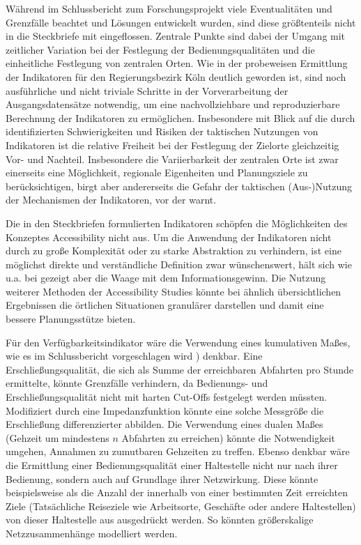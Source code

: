 \documentclass[11pt,pdftex,a4paper]{scrartcl}
\begin{document}
	Während im Schlussbericht zum Forschungsprojekt viele Eventualitäten und Grenzfälle beachtet und Lösungen entwickelt wurden, sind diese größtenteils nicht in die Steckbriefe mit eingeflossen. Zentrale Punkte sind dabei der Umgang mit zeitlicher Variation bei der Festlegung der Bedienungsqualitäten und die einheitliche Festlegung von zentralen Orten. Wie in der probeweisen Ermittlung der Indikatoren für den Regierungsbezirk Köln deutlich geworden ist, sind noch ausführliche und nicht triviale Schritte in der Vorverarbeitung der Ausgangsdatensätze notwendig, um eine nachvollziehbare und reproduzierbare Berechnung der Indikatoren zu ermöglichen. Insbesondere mit Blick auf die durch  \textcite{haldenUseAbuseAccessibility2011} identifizierten Schwierigkeiten und Risiken der taktischen Nutzungen von Indikatoren ist die relative Freiheit bei der Festlegung der Zielorte gleichzeitig Vor- und Nachteil. Insbesondere die Variierbarkeit der zentralen Orte ist zwar einerseits eine Möglichkeit, regionale Eigenheiten und Planungsziele zu berücksichtigen, birgt aber andererseits die Gefahr der taktischen (Aus-)Nutzung der Mechanismen der Indikatoren, vor der \textcite{haldenUseAbuseAccessibility2011} warnt.
	
	Die in den Steckbriefen formulierten Indikatoren schöpfen die Möglichkeiten des Konzeptes Accessibility nicht aus. Um die Anwendung der Indikatoren nicht durch zu große Komplexität oder zu starke Abstraktion zu verhindern, ist eine möglichst direkte und verständliche Definition zwar wünschenswert, hält sich wie u.a. bei \textcites{papaAccessibilityInstrumentsPlanning2016}{silvaAccessibilityInstrumentsPlanning2017}{boisjolyInsiderPlannersPerspective2017}{papaLearningProcessAccessibility2017} gezeigt aber die Waage mit dem Informationsgewinn. Die Nutzung weiterer Methoden der Accessibility Studies könnte bei ähnlich übersichtlichen Ergebnissen die örtlichen Situationen granulärer darstellen und damit eine bessere Planungsstütze bieten.
	
	Für den Verfügbarkeitsindikator wäre die Verwendung eines kumulativen Maßes, wie es im Schlussbericht vorgeschlagen wird \parencite[176f]{kcwgmbhMethodikUndEmpfehlungen2024}) denkbar. Eine Erschließungsqualität, die sich als Summe der erreichbaren Abfahrten pro Stunde ermittelte, könnte Grenzfälle verhindern, da Bedienungs- und Erschließungsqualität nicht mit harten Cut-Offs festgelegt werden müssten. Modifiziert durch eine Impedanzfunktion könnte eine solche Messgröße die Erschließung differenzierter abbilden. Die Verwendung eines dualen Maßes (Gehzeit um mindestens $n$ Abfahrten zu erreichen) könnte die Notwendigkeit umgehen, Annahmen zu zumutbaren Gehzeiten zu treffen. Ebenso denkbar wäre die Ermittlung einer Bedienungsqualität einer Haltestelle nicht nur nach ihrer Bedienung, sondern auch auf Grundlage ihrer Netzwirkung. Diese könnte beispielsweise als die Anzahl der innerhalb von einer bestimmten Zeit erreichten Ziele (Tatsächliche Reiseziele wie Arbeitsorte, Geschäfte oder andere Haltestellen) von dieser Haltestelle aus ausgedrückt werden. So könnten größerskalige Netzzusammenhänge modelliert werden.
	
\end{document}
